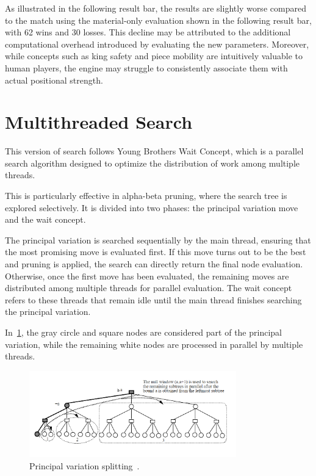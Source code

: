 \noindent As illustrated in the following result bar, the results are slightly worse compared to the match using the material-only evaluation shown in the following result bar, with 62 wins and 30 losses. This decline may be attributed to the additional computational overhead introduced by evaluating the new parameters. Moreover, while concepts such as king safety and piece mobility are intuitively valuable to human players, the engine may struggle to consistently associate them with actual positional strength.

\begin{center}
\medskip
\end{center}

\section{Multithreaded Search}

This version of search follows Young Brothers Wait Concept, which is a parallel search algorithm designed to optimize the distribution of work among multiple threads.

\vspace{1em}

\noindent This is particularly effective in alpha-beta pruning, where the search tree is explored selectively. It is divided into two phases: the principal variation move and the wait concept.

\vspace{1em}

\noindent The principal variation is searched sequentially by the main thread, ensuring that the most promising move is evaluated first. If this move turns out to be the best and pruning is applied, the search can directly return the final node evaluation. Otherwise, once the first move has been evaluated, the remaining moves are distributed among multiple threads for parallel evaluation. The wait concept refers to these threads that remain idle until the main thread finishes searching the principal variation.

\vspace{1em}

\noindent In~\cref{fig:pvsplitting}, the gray circle and square nodes are considered part of the principal variation, while the remaining white nodes are processed in parallel by multiple threads.

\begin{figure}
   \centering
   \includegraphics[width=0.8\textwidth]{Imagenes/Bitmap/pvsplitting.png}
   \caption{Principal variation splitting~\cite{PVSplitting}.}\label{fig:pvsplitting}
\end{figure}

